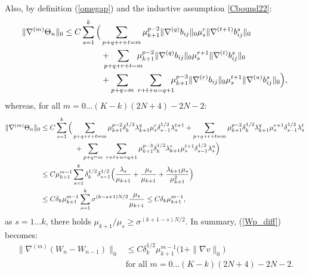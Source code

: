 \documentclass[reqno,twoside,11pt]{amsart}
\numberwithin{equation}{section}
\theoremstyle{plain}
\theoremstyle{definition}
\begin{document}
Also, by definition (\ref{omegap}) and the inductive assumption \ref{Cbound22}:
\begin{equation*}
\begin{split}
\|\nabla^{(m)}\Theta_n\|_0\leq C\sum_{s=1}^k\Big( &
\sum_{p+q+r+t=m} \mu_{k+1}^{p-2}\|\nabla^{(q)}
b_{ij}\|_0\mu_s^r\|\nabla^{(t+1)}b_{ij}^s\|_0 \\ & + 
\hspace{-3mm}\sum_{p+q+r+t=m} \hspace{-3mm}\mu_{k+1}^{p-2}\|\nabla^{(q)}
b_{ij}\|_0\mu_s^{r+1}\|\nabla^{(t)}b_{ij}^s\|_0 \\ & + \hspace{-0mm}\sum_{p+q=m} \; \sum_{r+t+u=q+1} 
\hspace{-2mm}\mu_{k+1}^{p-3}\|\nabla^{(r)}b_{ij}\|_0\mu_s^{t+1}\|\nabla^{(u)}b_{ij}^s\|_0  \Big),
\end{split}
\end{equation*}
whereas, for all $m=0\ldots (K-k)(2N+4)-2N-2$:
\begin{equation*}
\begin{split}
\|\nabla^{(m)}\Theta_n\|_0 & \leq C\sum_{s=1}^k\Big(
\sum_{p+q+r+t=m} \mu_{k+1}^{p-2} \delta_k^{1/2} \lambda_{k+1}^q\mu_s^r
\delta_{s-1}^{1/2} \lambda_{s}^{t+1}+ 
\sum_{p+q+r+t=m} \mu_{k+1}^{p-2}\delta_k^{1/2} \lambda_{k+1}^q
\mu_s^{r+1}\delta_{s-1}^{1/2} \lambda_{s}^t \\ & \hspace{1.7cm} + \sum_{p+q=m} \;\sum_{r+t+u=q+1} 
\mu_{k+1}^{p-3} \delta_k^{1/2} \lambda_{k+1}^r\mu_s^{t+1}
\delta_{s-1}^{1/2} \lambda_{s}^u\Big)
\\ & \leq C \mu_{k+1}^{m-1} \sum_{s=1}^k \delta_k^{1/2}\delta_{s-1}^{1/2}\Big(
\frac{\lambda_s}{\mu_{k+1}} + \frac{\mu_s}{\mu_{k+1}} + \frac{\lambda_{k+1}\mu_s}{\mu_{k+1}^2}\Big) 
\\ & \leq C \delta_k \mu_{k+1}^{m-1}\sum_{s=1}^k \sigma^{(k-s+1)N/2}
\frac{\mu_s}{\mu_{k+1}} \leq C\delta_k\mu_{k+1}^{m-1},
\end{split}
\end{equation*}
as  $s=1\ldots k$, there holds $\mu_{k+1}/\mu_s\geq \sigma^{(k+1-s)N/2}$.
In summary, (\ref{Wp_diff}) becomes:
\begin{equation*}
\begin{split}
\|\nabla^{(m)}(W_n-W_{n-1})\|_0& \leq C
\delta_k^{1/2}\mu_{k+1}^{m-1}\big(1+\|\nabla v\|_0\big)  
\\ & \mbox{for all } m=0\ldots (K-k)(2N+4)-2N-2.
\end{split}
\end{equation*}
\end{document}
